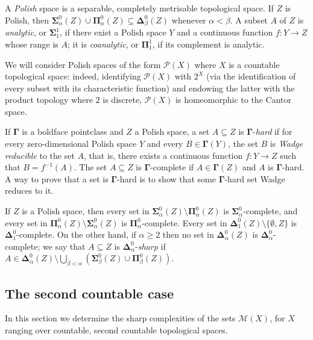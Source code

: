 \documentclass{lmcs}
\newcommand{\bsigma}{\boldsymbol\Sigma}
\newcommand{\bpi}{\boldsymbol\Pi}
\newcommand{\bdelta}{\boldsymbol\Delta}
\begin{document}
A \emph{Polish} space is a separable, completely metrisable topological space.
If $Z$ is Polish, then $ \bsigma^0_{\alpha }(Z)\cup \bpi^0_{\alpha }(Z)\subseteq \bdelta^0_{\beta }(Z)$ whenever $\alpha <\beta $.
A subset $A$ of $Z$ is \emph{analytic}, or $ \bsigma^1_1$, if there exist a Polish space $Y$ and a continuous function $f:Y\to Z$ whose range is $A$; it is \emph{coanalytic}, or $ \bpi^1_1$, if its complement is analytic.

We will consider Polish spaces of the form $ \mathcal P (X)$ where $X$ is a countable topological space: indeed, identifying $ \mathcal P (X)$ with $2^X$ (via the identification of every subset with its characteristic function) and endowing the latter with the product topology where $2$ is discrete, $ \mathcal P (X)$ is homeomorphic to the Cantor space.

If $ \boldsymbol \Gamma $ is a boldface pointclass and $Z$ a Polish space, a set $A\subseteq Z$ is $\boldsymbol \Gamma $-\emph{hard} if for every zero-dimensional Polish space $Y$ and every $B\in \boldsymbol \Gamma (Y)$, the set $B$ is \emph{Wadge reducible} to the set $A$, that is, there exists a continuous function $f:Y\to Z$ such that $B=f^{-1}(A)$.
The set $A\subseteq Z$ is $ \boldsymbol \Gamma $-complete if $A\in \boldsymbol \Gamma (Z)$ and $A$ is $ \boldsymbol \Gamma $-hard.
A way to prove that a set is $ \boldsymbol \Gamma $-hard is to show that some $ \boldsymbol \Gamma $-hard set Wadge reduces to it.

If $Z$ is a Polish space, then every set in $ \bsigma^0_{\alpha }(Z)\setminus \bpi^0_{\alpha }(Z)$ is $ \bsigma^0_{\alpha }$-complete, and every set in $ \bpi^0_{\alpha }(Z)\setminus \bsigma^0_{\alpha }(Z)$ is $ \bpi^0_{\alpha }$-complete.
Every set in $ \bdelta^0_1(Z)\setminus\{\emptyset ,Z\} $ is $ \bdelta^0_1$-complete.
On the other hand, if $\alpha\geqslant 2$ then no set in $ \bdelta^0_{\alpha }(Z)$ is $ \bdelta^0_{\alpha }$-complete; we say that $A\subseteq Z$ is $ \bdelta^0_{\alpha }$-\emph{sharp} if $A\in \bdelta^0_{\alpha }(Z)\setminus\bigcup_{\beta <\alpha }( \bsigma^0_{\beta }(Z)\cup \bpi^0_{\beta }(Z))$.


\subsection{The second countable case} \label{sec:sccnt}
In this section we determine the sharp complexities of the sets $ \mathcal M (X)$, for $X$ ranging over countable, second countable topological spaces.
\end{document}
